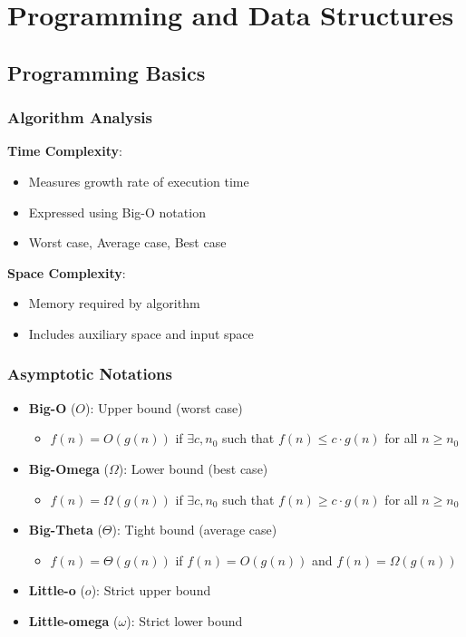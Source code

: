 \documentclass[12pt,a4paper]{report}
\begin{document}
\chapter{Programming and Data Structures}

\section{Programming Basics}

\subsection{Algorithm Analysis}
\begin{concept}
\textbf{Time Complexity}:
\begin{itemize}
    \item Measures growth rate of execution time
    \item Expressed using Big-O notation
    \item Worst case, Average case, Best case
\end{itemize}

\textbf{Space Complexity}:
\begin{itemize}
    \item Memory required by algorithm
    \item Includes auxiliary space and input space
\end{itemize}
\end{concept}

\subsection{Asymptotic Notations}
\begin{concept}
\begin{itemize}
    \item \textbf{Big-O} ($O$): Upper bound (worst case)
        \begin{itemize}
            \item $f(n) = O(g(n))$ if $\exists c, n_0$ such that $f(n) \leq c \cdot g(n)$ for all $n \geq n_0$
        \end{itemize}
    \item \textbf{Big-Omega} ($\Omega$): Lower bound (best case)
        \begin{itemize}
            \item $f(n) = \Omega(g(n))$ if $\exists c, n_0$ such that $f(n) \geq c \cdot g(n)$ for all $n \geq n_0$
        \end{itemize}
    \item \textbf{Big-Theta} ($\Theta$): Tight bound (average case)
        \begin{itemize}
            \item $f(n) = \Theta(g(n))$ if $f(n) = O(g(n))$ and $f(n) = \Omega(g(n))$
        \end{itemize}
    \item \textbf{Little-o} ($o$): Strict upper bound
    \item \textbf{Little-omega} ($\omega$): Strict lower bound
\end{itemize}
\end{concept}
\end{document}
